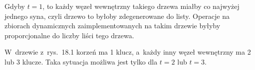 
\exercise %
Gdyby $t=1$, to każdy węzeł wewnętrzny takiego drzewa miałby co najwyżej jednego syna, czyli drzewo to byłoby zdegenerowane do listy.
Operacje na zbiorach dynamicznych zaimplementowanych na takim drzewie byłyby proporcjonalne do liczby liści tego drzewa.

\exercise %
W~drzewie z~rys.\ 18.1 korzeń ma 1 klucz, a~każdy inny węzeł wewnętrzny ma 2 lub 3 klucze.
Taka sytuacja możliwa jest tylko dla $t=2$ lub $t=3$.

\exercise %
\exercise %
\exercise %
